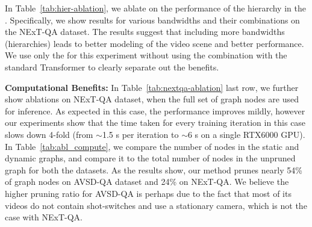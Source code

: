 \documentclass[letterpaper]{article} %
\begin{document}
In Table~\ref{tab:hier-ablation}, we ablate on the performance of the hierarchy in the \nameTxr. Specifically, we show results for various bandwidths and their combinations on the NExT-QA dataset. The results suggest that including more bandwidths (hierarchies) leads to better modeling of the video scene and better performance. We use only the \nameTxr for this experiment without using the combination with the standard Transformer to clearly separate out the benefits.

\noindent\textbf{Computational Benefits:} In Table~\ref{tab:nextqa-ablation} last row, we further show ablations on NExT-QA dataset, when the full set of graph nodes are used for inference. As expected in this case, the performance improves mildly, however our experiments show that the time taken for every training iteration in this case slows down 4-fold (from $\sim$1.5 s per iteration to $\sim$6 s on a single RTX6000 GPU). In Table~\ref{tab:abl_compute}, we compare the number of nodes in the static and dynamic graphs, and compare it to the total number of nodes in the unpruned graph for both the datasets. As the results show, our method prunes nearly 54\% of graph nodes on AVSD-QA dataset and 24\% on NExT-QA. We believe the higher pruning ratio for AVSD-QA is perhaps due to the fact that most of its videos do not contain shot-switches and use a stationary camera, which is not the case with NExT-QA.
\end{document}

